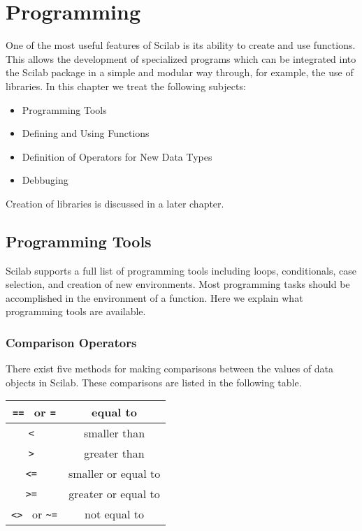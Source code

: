 
\chapter{Programming}
\label{ch4}

	One of the most useful features of Scilab is its ability
to create and use functions.  This allows the development of specialized
programs which can be integrated into the Scilab package in a simple and
modular way through, for example, the use of libraries.  In this chapter we 
treat the following subjects:
\begin{itemize}
	\item Programming Tools
	\item Defining and Using Functions
        \item Definition of Operators for New Data Types
	\item{Debbuging}
\end{itemize}	
Creation of libraries is discussed in a later chapter.

\section{Programming Tools}

	Scilab supports a full list of programming tools
including loops, conditionals, case selection,
and creation of new environments.  Most programming tasks
should be accomplished in the environment of a function.
Here we explain what programming tools are available.

\subsection{Comparison Operators}
There exist five methods for making comparisons between the
values of data objects in Scilab. These comparisons are listed
in the following table.

\begin{center}
\begin{tabular}{|c|c|}
\hline
{\tt == } or {\tt =} & equal to \\ \hline
{\tt < } & smaller than \\ \hline
{\tt > } &  greater than \\ \hline
{\tt <= } & smaller or equal to \\ \hline
{\tt >= } & greater or equal to \\ \hline
{\tt <> } or {\verb!~=!} & not equal to \\ \hline
\end{tabular}
\end{center}

